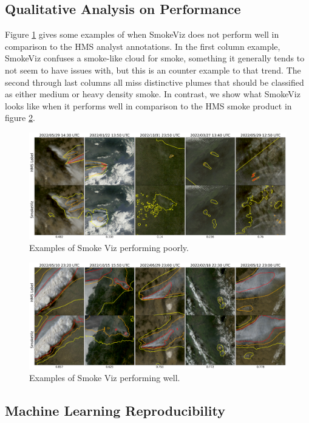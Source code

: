 \documentclass{article}
\begin{document}
\subsection{Qualitative Analysis on Performance}

Figure \ref{poor} gives some examples of when SmokeViz does not perform well in comparison to the HMS analyst annotations. In the first column example, SmokeViz confuses a smoke-like cloud for smoke, something it generally tends to not seem to have issues with, but this is an counter example to that trend. The second through last columns all miss distinctive plumes that should be classified as either medium or heavy density smoke. In contrast, we show what SmokeViz looks like when it performs well in comparison to the HMS smoke product in figure \ref{good}.

\begin{figure}[!htb]
    \centering
    \includegraphics[width=\linewidth]{stat_figs/bad_results.png}
    \caption{Examples of Smoke Viz performing poorly.}
    \label{poor}
\end{figure}


\begin{figure}[!htb]
    \centering
    \includegraphics[width=\linewidth]{stat_figs/good_results.png}
    \caption{Examples of Smoke Viz performing well.}
    \label{good}
\end{figure}


\subsection{Machine Learning Reproducibility}
\end{document}
